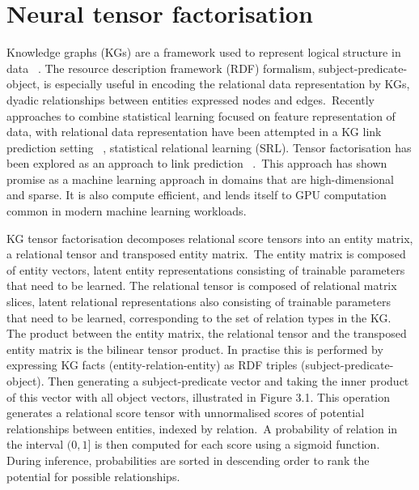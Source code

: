\chapter{Neural tensor factorisation}


\ifpdf
     \graphicspath{{Figs/Chapter3/}}
\else
    \graphicspath{{Chapter3/Figs/Vector/}{Chapter3/Figs/}}
\fi

Knowledge graphs (KGs) are a framework used to represent logical structure in data \unskip ~\citep{koller2007introduction}. The resource description framework (RDF) formalism, subject-predicate-object, is especially useful in encoding the relational data representation by KGs, dyadic relationships between entities expressed nodes and edges.\ Recently approaches to combine statistical learning focused on feature representation of data, with relational data representation have been attempted in a KG link prediction setting \unskip~\citep{kazemi2018simple, chang2014typed, kang2012gigatensor}, statistical relational learning (SRL). Tensor factorisation has been explored as an approach to link prediction \unskip ~\citep{nickel2011three, bordes2013translating, trouillon2016complex}.\ This approach has shown promise as a machine learning approach in domains that are high-dimensional and sparse. It is also compute efficient, and lends itself to GPU computation common in modern machine learning workloads. \par

\noindent KG tensor factorisation decomposes relational score tensors into an entity matrix, a relational tensor and transposed entity matrix.\ The entity matrix is composed of entity vectors, latent entity representations consisting of trainable parameters that need to be learned. The relational tensor is composed of relational matrix slices, latent relational representations also consisting of trainable parameters that need to be learned, corresponding to the set of relation types in the KG. The product between the entity matrix, the relational tensor and the transposed entity matrix is the bilinear tensor product. In practise this is performed by expressing KG facts (entity-relation-entity) as RDF triples (subject-predicate-object). Then generating a subject-predicate vector and taking the inner product of this vector with all object vectors, illustrated in Figure 3.1. This operation generates a relational score tensor with unnormalised scores of potential relationships between entities, indexed by relation.\ A probability of relation in the interval $ (0, 1] $ is then computed for each score using a sigmoid function. During inference, probabilities are sorted in descending order to rank the potential for possible relationships. \par

